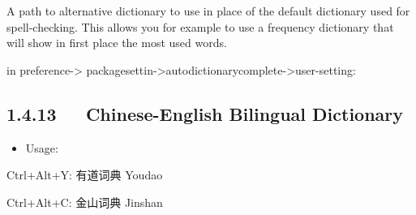 \documentclass[letterpaper,12pt,english]{sphinxmanual}
\begin{document}
A path to alternative dictionary to use in place of the default
dictionary used for spell-checking. This allows you for example to use a
frequency dictionary that will show in first place the most used words.

in preference-\textgreater{} packagesettin-\textgreater{}autodictionarycomplete-\textgreater{}user-setting:

\begin{sphinxVerbatim}[commandchars=\\\{\}]
 
   
             
     
           
        
       
      
\end{sphinxVerbatim}


\subsection{1.4.13   Chinese-English Bilingual Dictionary}
\label{\detokenize{001software/001install/sublime:chinese-english-bilingual-dictionary}}
\begin{itemize}
\item {} 
Usage:

\end{itemize}

Ctrl+Alt+Y: 有道词典 Youdao

Ctrl+Alt+C: 金山词典 Jinshan
\end{document}
